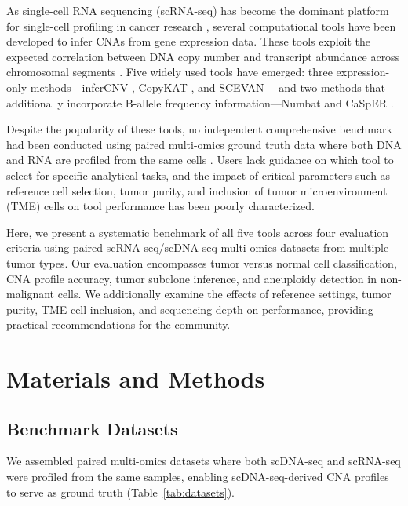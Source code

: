 \documentclass[11pt]{article}
\begin{document}
As single-cell RNA sequencing (scRNA-seq) has become the dominant platform for single-cell profiling in cancer research \citep{Patel2014,Tirosh2016}, several computational tools have been developed to infer CNAs from gene expression data. These tools exploit the expected correlation between DNA copy number and transcript abundance across chromosomal segments \citep{Patel2014,Fan2018}. Five widely used tools have emerged: three expression-only methods---inferCNV \citep{Patel2014,Tirosh2016}, CopyKAT \citep{Gao2021}, and SCEVAN \citep{DeFalco2023}---and two methods that additionally incorporate B-allele frequency information---Numbat \citep{Gao2023} and CaSpER \citep{Serin2019}.

Despite the popularity of these tools, no independent comprehensive benchmark had been conducted using paired multi-omics ground truth data where both DNA and RNA are profiled from the same cells \citep{Zhou2020,Yu2021}. Users lack guidance on which tool to select for specific analytical tasks, and the impact of critical parameters such as reference cell selection, tumor purity, and inclusion of tumor microenvironment (TME) cells on tool performance has been poorly characterized.

Here, we present a systematic benchmark of all five tools across four evaluation criteria using paired scRNA-seq/scDNA-seq multi-omics datasets from multiple tumor types. Our evaluation encompasses tumor versus normal cell classification, CNA profile accuracy, tumor subclone inference, and aneuploidy detection in non-malignant cells. We additionally examine the effects of reference settings, tumor purity, TME cell inclusion, and sequencing depth on performance, providing practical recommendations for the community.

\section{Materials and Methods}

\subsection{Benchmark Datasets}

We assembled paired multi-omics datasets where both scDNA-seq and scRNA-seq were profiled from the same samples, enabling scDNA-seq-derived CNA profiles to serve as ground truth (Table~\ref{tab:datasets}).
\end{document}
